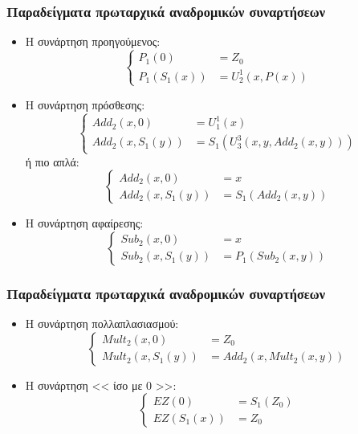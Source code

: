 \documentclass{beamer}
\begin{document}
\begin{frame}
        \frametitle{Παραδείγματα πρωταρχικά αναδρομικών συναρτήσεων}
        \begin{itemize}
                \item Η συνάρτηση προηγούμενος:
                $$\left\{
                     \begin{array}{ll}
                       P_1(0)      &= Z_0\\
                       P_1(S_1(x)) &= U^1_2(x,P(x))
                     \end{array}
                \right.$$
                \pause
                \item Η συνάρτηση πρόσθεσης:
                $$\left\{
                    \begin{array}{ll}
                      Add_2(x, 0)      &= U^1_1(x)\\
                      Add_2(x, S_1(y)) &= S_1(U^3_3(x, y , Add_2(x, y)))
                    \end{array}
                \right.$$
                \pause
                ή πιο απλά:
                $$\left\{
                    \begin{array}{ll}
                      Add_2(x, 0)      &= x\\
                      Add_2(x, S_1(y)) &= S_1(Add_2(x, y))
                    \end{array}
                \right.$$
                \pause
                \item Η συνάρτηση αφαίρεσης:
                $$\left\{
                    \begin{array}{ll}
                      Sub_2(x, 0)      &= x\\
                      Sub_2(x, S_1(y)) &= P_1(Sub_2(x, y))
                    \end{array}
                \right.$$
        \end{itemize}
\end{frame}

\begin{frame}
        \frametitle{Παραδείγματα πρωταρχικά αναδρομικών συναρτήσεων}
        \begin{itemize}
                \item Η συνάρτηση πολλαπλασιασμού:
                $$\left\{
                    \begin{array}{ll}
                      Mult_2(x, 0)      &= Z_0\\
                      Mult_2(x, S_1(y)) &= Add_2(x, Mult_2(x, y))
                    \end{array}
                \right.$$
                \pause
                \item Η συνάρτηση << ίσο με 0 >>:
                $$\left\{
                    \begin{array}{ll}
                      EZ(0)      &= S_1(Z_0)\\
                      EZ(S_1(x)) &= Z_0
                    \end{array}
                \right.$$
        \end{itemize}
\end{frame}
\end{document}
